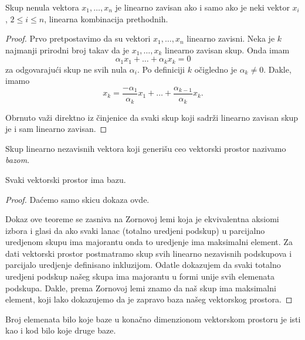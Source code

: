 \documentclass{article}
\begin{document}
\begin{theorem}
  Skup nenula vektora $x_1, \ldots, x_n$ je linearno zavisan ako i samo ako je neki vektor $x_i$, $2 \le i \le n$, linearna kombinacija prethodnih.
\end{theorem}

\begin{proof}
  Prvo pretpostavimo da su vektori $x_1 , \ldots, x_n$ linearno zavisni.
  Neka je $k$ najmanji prirodni broj takav da je $x_1 , \ldots, x_k$ linearno zavisan skup.
  Onda imam 
  \[\alpha_1 x_1 + \ldots + \alpha_k x_k = 0\]
  za odgovarajući skup ne svih nula $\alpha_i$.
  Po definiciji $k$ očigledno je $\alpha_k \neq 0$.
  Dakle, imamo
  \[x_k = \frac{-\alpha_1}{\alpha_k} x_1 + \ldots + \frac{\alpha_{k - 1}}{\alpha_k} x_k.\]

  Obrnuto važi direktno iz činjenice da svaki skup koji sadrži linearno zavisan skup je i sam linearno zavisan.
\end{proof}

\begin{definition}[Baza]
  Skup linearno nezavisnih vektora koji generišu ceo vektorski prostor nazivamo \textit{bazom}.
\end{definition}

\begin{theorem}
  Svaki vektorski prostor ima bazu.
\end{theorem}

\begin{proof}
  Daćemo samo skicu dokaza ovde.

  Dokaz ove teoreme se zasniva na Zornovoj lemi koja je ekvivalentna aksiomi izbora i glasi da ako svaki lanac (totalno uredjeni podskup) u parcijalno uredjenom skupu ima majorantu onda to uredjenje ima maksimalni element.
  Za dati vektorski prostor postmatramo skup svih linearno nezavisnih podskupova i parcijalo uredjenje definisano inkluzijom.
  Odatle dokazujem da svaki totalno uredjeni podskup našeg skupa ima majorantu u formi unije svih elemenata podskupa.
  Dakle, prema Zornovoj lemi znamo da naš skup ima maksimalni element, koji lako dokazujemo da je zapravo baza našeg vektorskog prostora.
\end{proof}

\begin{theorem}
  Broj elemenata bilo koje baze u konačno dimenzionom vektorskom prostoru je isti kao i kod bilo koje druge baze.
\end{theorem}
\end{document}
